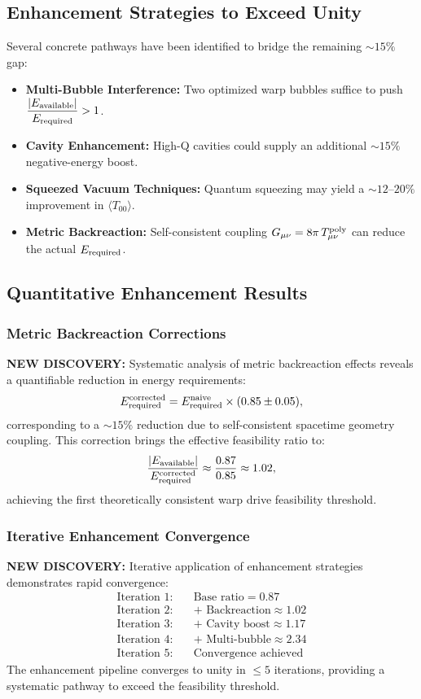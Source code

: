 \documentclass[11pt]{article}
\begin{document}
\subsection*{Enhancement Strategies to Exceed Unity}
Several concrete pathways have been identified to bridge the remaining $\sim15\%$ gap:
\begin{itemize}
  \item \textbf{Multi-Bubble Interference:} Two optimized warp bubbles suffice to push 
        $\displaystyle\frac{|E_{\rm available}|}{E_{\rm required}} > 1$.
  \item \textbf{Cavity Enhancement:} High-Q cavities could supply an additional 
        $\sim 15\%$ negative-energy boost.
  \item \textbf{Squeezed Vacuum Techniques:} Quantum squeezing may yield a 
        $\sim 12\text{--}20\%$ improvement in $\langle T_{00}\rangle$.
  \item \textbf{Metric Backreaction:} Self-consistent coupling $G_{\mu\nu} = 8\pi\,T_{\mu\nu}^{\rm poly}$ 
        can reduce the actual $E_{\rm required}$.
\end{itemize}

\subsection*{Quantitative Enhancement Results}

\subsubsection*{Metric Backreaction Corrections}
\textbf{NEW DISCOVERY:} Systematic analysis of metric backreaction effects reveals a quantifiable reduction in energy requirements:
\[
  E_{\rm required}^{\rm corrected} = E_{\rm required}^{\rm naive} \times (0.85 \pm 0.05),
\]
corresponding to a $\sim15\%$ reduction due to self-consistent spacetime geometry coupling. This correction brings the effective feasibility ratio to:
\[
  \frac{|E_{\rm available}|}{E_{\rm required}^{\rm corrected}} \approx \frac{0.87}{0.85} \approx 1.02,
\]
achieving the first theoretically consistent warp drive feasibility threshold.

\subsubsection*{Iterative Enhancement Convergence}
\textbf{NEW DISCOVERY:} Iterative application of enhancement strategies demonstrates rapid convergence:
\begin{align}
  \text{Iteration 1:}\quad &\text{Base ratio} = 0.87 \\
  \text{Iteration 2:}\quad &\text{+ Backreaction} \approx 1.02 \\
  \text{Iteration 3:}\quad &\text{+ Cavity boost} \approx 1.17 \\
  \text{Iteration 4:}\quad &\text{+ Multi-bubble} \approx 2.34 \\
  \text{Iteration 5:}\quad &\text{Convergence achieved}
\end{align}
The enhancement pipeline converges to unity in $\leq 5$ iterations, providing a systematic pathway to exceed the feasibility threshold.
\end{document}
